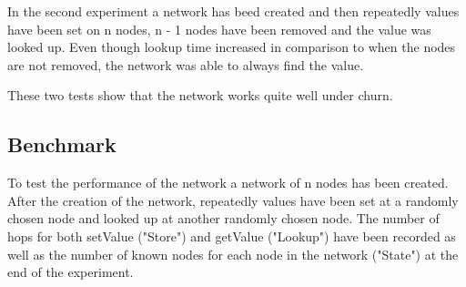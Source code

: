\documentclass[a4paper, 12pt]{article} %
\begin{document}
In the second experiment a network has beed created and then repeatedly values have been set on n nodes, n - 1 nodes have been removed and the value was looked up. Even though lookup time increased in comparison to when the nodes are not removed, the network was able to always find the value.

These two tests show that the network works quite well under churn.

\subsection{Benchmark}

To test the performance of the network a network of n nodes has been created. After the creation of the network, repeatedly values have been set at a randomly chosen node and looked up at another randomly chosen node. The number of hops for both setValue ("Store") and getValue ("Lookup") have been recorded as well as the number of known nodes for each node in the network ("State") at the end of the experiment.
\end{document}
